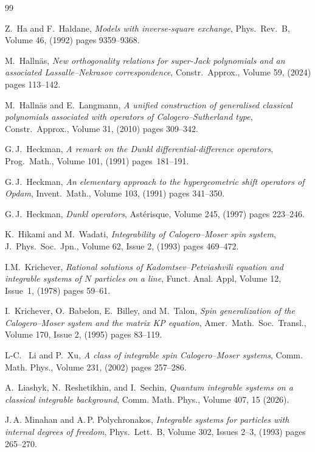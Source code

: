 \documentclass[12pt]{amsart}
\numberwithin{equation}{section}
\theoremstyle{definition}
\begin{document}
\begin{small}
\begin{thebibliography}{99}
{
Z.\ Ha and F.\ Haldane, \textit{Models with inverse-square exchange},
Phys.\ Rev.\ B, Volume 46, (1992) pages 9359--9368.

M.\ Hallnäs, \textit{New orthogonality relations for super-Jack polynomials and an associated Lassalle--Nekrasov correspondence}, Constr.\ Approx., Volume 59, (2024) pages 113--142.

M.\ Hallnäs and E.\ Langmann, \textit{A unified construction of generalised classical polynomials associated with operators of Calogero--Sutherland type}, Constr.\ Approx., Volume 31, (2010) pages 309--342.


G.\,J.\ Heckman, \textit{A remark on the Dunkl differential-difference operators}, Prog.\ Math., Volume 101, (1991) pages~181--191.

G.\,J.\ Heckman, \textit{An elementary approach to the hypergeometric shift operators of Opdam}, Invent.\ Math., Volume 103, (1991) pages 341--350.

G.\,J.\ Heckman, \textit{Dunkl operators}, Ast\'erisque, Volume 245, (1997) pages 223--246.

K.\ Hikami and M.\ Wadati, \textit{Integrability of Calogero--Moser spin system}, J.\ Phys.\ Soc.\ Jpn., Volume 62, Issue 2, (1993) pages 469--472.

I.M.\  Krichever, \textit{Rational solutions of Kadomtsev--Petviashvili equation and integrable systems
of $N$ particles on a line}, Funct. Anal. Appl, Volume 12, Issue~1, (1978) pages 59--61.

 I.\ Krichever, O.\ Babelon, E.\ Billey, and M.\ Talon, \textit{Spin generalization of the Calogero--Moser system and the matrix KP equation}, Amer.\ Math.\ Soc.\ Transl., Volume 170, Issue 2, (1995) pages 83--119.

L-C. \ Li and P.\ Xu, \textit{A class of integrable spin Calogero--Moser systems}, Comm. Math. Phys., Volume 231, (2002) pages 257--286.

A.\ Liashyk, N.\ Reshetikhin, and I.\ Sechin, \textit{Quantum integrable systems on a classical integrable background}, Comm. Math. Phys., Volume 407, 15 (2026).

J.\,A. Minahan and A.\,P. Polychronakos, \textit{Integrable systems for particles with internal degrees of freedom}, Phys.\ Lett.\ B, Volume 302, Issues 2–3, (1993) pages 265--270.

}
\end{thebibliography}
\end{small}
\end{document}

